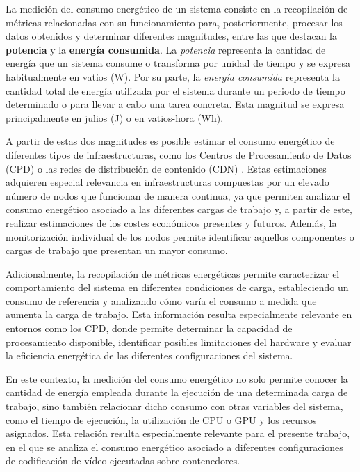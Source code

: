 La medición del consumo energético de un sistema consiste en la recopilación de métricas relacionadas con su funcionamiento para, posteriormente, procesar los datos obtenidos y determinar diferentes magnitudes, entre las que destacan la \textbf{potencia} y la \textbf{energía consumida}. La \textit{potencia} representa la cantidad de energía que un sistema consume o transforma por unidad de tiempo y se expresa habitualmente en vatios (W). Por su parte, la \textit{energía consumida} representa la cantidad total de energía utilizada por el sistema durante un periodo de tiempo determinado o para llevar a cabo una tarea concreta. Esta magnitud se expresa principalmente en julios (J) o en vatios-hora (Wh).
 
 A partir de estas dos magnitudes es posible estimar el consumo energético de diferentes tipos de infraestructuras, como los Centros de Procesamiento de Datos (CPD) o las redes de distribución de contenido (CDN) \cite{cloud-consuming-ieee}. Estas estimaciones adquieren especial relevancia en infraestructuras compuestas por un elevado número de nodos que funcionan de manera continua, ya que permiten analizar el consumo energético asociado a las diferentes cargas de trabajo y, a partir de este, realizar estimaciones de los costes económicos presentes y futuros. Además, la monitorización individual de los nodos permite identificar aquellos componentes o cargas de trabajo que presentan un mayor consumo.
 
 Adicionalmente, la recopilación de métricas energéticas permite caracterizar el comportamiento del sistema en diferentes condiciones de carga, estableciendo un consumo de referencia y analizando cómo varía el consumo a medida que aumenta la carga de trabajo. Esta información resulta especialmente relevante en entornos como los CPD, donde permite determinar la capacidad de procesamiento disponible, identificar posibles limitaciones del hardware y evaluar la eficiencia energética de las diferentes configuraciones del sistema.
 
 En este contexto, la medición del consumo energético no solo permite conocer la cantidad de energía empleada durante la ejecución de una determinada carga de trabajo, sino también relacionar dicho consumo con otras variables del sistema, como el tiempo de ejecución, la utilización de CPU o GPU y los recursos asignados. Esta relación resulta especialmente relevante para el presente trabajo, en el que se analiza el consumo energético asociado a diferentes configuraciones de codificación de vídeo ejecutadas sobre contenedores.
 
